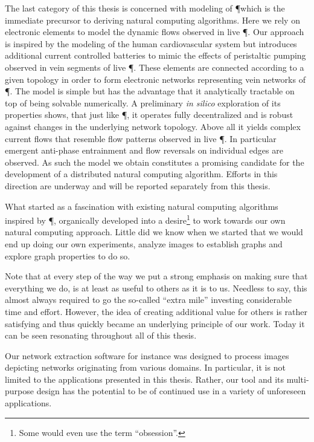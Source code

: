 	The last category of this thesis is concerned with modeling of \P which is the immediate precursor to deriving natural computing algorithms. Here we rely on electronic elements to model the dynamic flows observed in live \P. Our approach is inspired by the modeling of the human cardiovascular system but introduces additional current controlled batteries to mimic the effects of peristaltic pumping observed in vein segments of live \P. These elements are connected according to a given topology in order to form electronic networks representing vein networks of \P. The model is simple but has the advantage that it analytically tractable on top of being solvable numerically. A preliminary \emph{in silico} exploration of its properties shows, that just like \P, it operates fully decentralized and is robust against changes in the underlying network topology. Above all it yields complex current flows that resemble flow patterns observed in live \P. In particular emergent anti-phase entrainment and flow reversals on individual edges are observed. As such the model we obtain constitutes a promising candidate for the development of a distributed natural computing algorithm. Efforts in this direction are underway and will be reported separately from this thesis.

	What started as a fascination with existing natural computing algorithms inspired by \P, organically developed into a desire\footnote{Some would even use the term ``obsession''.} to work towards our own natural computing approach. Little did we know when we started that we would end up doing our own experiments, analyze images to establish graphs and explore graph properties to do so.

	Note that at every step of the way we put a strong emphasis on making sure that everything we do, is at least as useful to others as it is to us. Needless to say, this almost always required to go the so-called ``extra mile'' investing considerable time and effort. However, the idea of creating additional value for others is rather satisfying and thus quickly became an underlying principle of our work. Today it can be seen resonating throughout all of this thesis. 

	Our network extraction software \NEFI for instance was designed to process images depicting networks originating from various domains. In particular, it is not limited to the applications presented in this thesis. Rather, our tool and its multi-purpose design has the potential to be of continued use in a variety of unforeseen applications.

